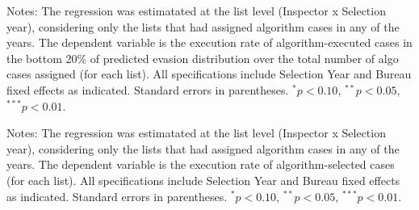 \documentclass{article}
\newcommand{\OutPath}{Output/}%
\newcommand{\OutPath}{../Output/}%
\begin{document}
\begin{landscape}
\begin{table}[H]
\begin{threeparttable}
\begin{tablenotes}[flushleft]
\footnotesize
\item Notes: The regression was estimatated at the list level (Inspector x Selection year), considering only the lists that had assigned algorithm cases in any of the years.  The dependent variable is the execution rate of algorithm-executed cases in the bottom 20\% of predicted evasion distribution over the total number of algo cases assigned (for each list). All specifications include Selection Year and Bureau fixed effects as indicated. Standard errors in parentheses. 
$^{*}p<0.10$, $^{**}p<0.05$, $^{***}p<0.01$.
\end{tablenotes}
\end{threeparttable}
\end{table}



\begin{table}[!htbp]\centering
\begin{threeparttable}
\caption{Share of High potential case  vrs overall execution rate [Desk audits]}
\label{tab:inspector_effort_share_Desk}
\footnotesize


\begin{tablenotes}[flushleft]
\footnotesize
\item Notes: The regression was estimatated at the list level (Inspector x Selection year), considering only the lists that had assigned algorithm cases in any of the years. The dependent variable is the execution rate of algorithm-selected cases (for each list). All specifications include Selection Year and Bureau fixed effects as indicated. Standard errors in parentheses. 
$^{*}p<0.10$, $^{**}p<0.05$, $^{***}p<0.01$.
\end{tablenotes}
\end{threeparttable}
\end{table}



\begin{table}[H]\centering
\begin{threeparttable}
\caption{Share of High potential case vrs execution rate of bottom 20\% cases [Desk audits]}
\label{tab:inspector_effort_share_Desk}
\footnotesize



\end{threeparttable}
\end{table}
\end{landscape}
\end{document}
